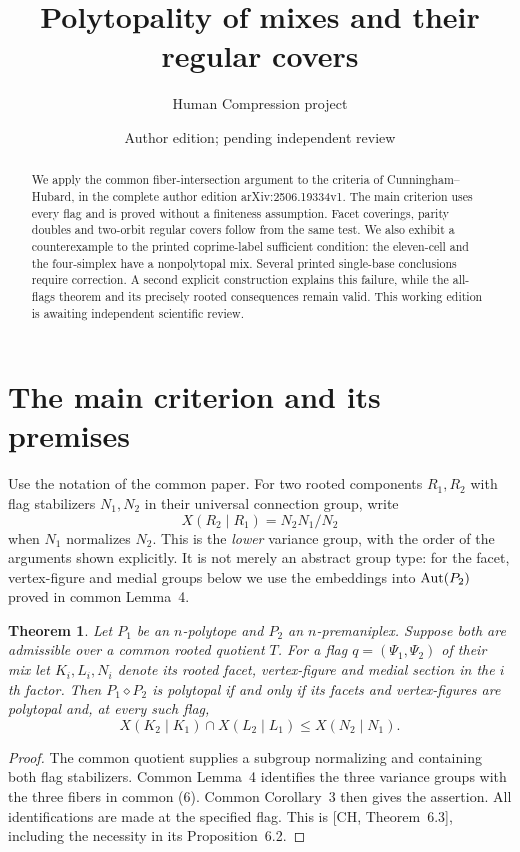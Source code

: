 \documentclass[a4paper,11pt]{article}
\title{Polytopality of mixes and their regular covers}
\author{Human Compression project}\date{Author edition; pending independent review}
\newcommand{\mix}{\mathbin{\diamond}}\newcommand{\Alt}{\operatorname{Alt}}
\newtheorem{theorem}{Theorem}\newtheorem{proposition}[theorem]{Proposition}\newtheorem{corollary}[theorem]{Corollary}
\begin{document}
\maketitle
\begin{abstract}
We apply the common fiber-intersection argument to the criteria of
Cunningham--Hubard, in the complete author edition arXiv:2506.19334v1.
The main criterion uses every flag and is proved without a finiteness
assumption. Facet coverings, parity doubles and two-orbit regular covers
follow from the same test. We also exhibit a counterexample to the
printed coprime-label sufficient condition: the eleven-cell and the
four-simplex have a nonpolytopal mix. Several printed single-base conclusions require correction. A second
explicit construction explains this failure, while the all-flags theorem
and its precisely rooted consequences remain valid. This working edition
is awaiting independent scientific review.
\end{abstract}

\section{The main criterion and its premises}
Use the notation of the common paper. For two rooted components $R_1,R_2$
with flag stabilizers $N_1,N_2$ in their universal connection group, write
\[
 X(R_2\mid R_1)=N_2N_1/N_2
\]
when $N_1$ normalizes $N_2$. This is the \emph{lower} variance group, with
the order of the arguments shown explicitly. It is not merely an abstract
group type: for the facet, vertex-figure and medial groups below we use
the embeddings into $\operatorname{Aut}(P_2)$ proved in common Lemma~4.

\begin{theorem}\label{main}
Let $P_1$ be an $n$-polytope and $P_2$ an $n$-premaniplex. Suppose
both are admissible over a common rooted quotient $T$. For a flag
$q=(\Psi_1,\Psi_2)$ of their mix let $K_i,L_i,N_i$ denote its rooted
facet, vertex-figure and medial section in the $i$th factor.
Then $P_1\mix P_2$ is polytopal if and only if its facets and
vertex-figures are polytopal and, at every such flag,
\[
 X(K_2\mid K_1)\cap X(L_2\mid L_1)\leq X(N_2\mid N_1). \tag{1}
\]
\end{theorem}
\begin{proof}
The common quotient supplies a subgroup normalizing and containing both
flag stabilizers. Common Lemma~4 identifies the three variance groups
with the three fibers in common (6). Common Corollary~3 then gives the
assertion. All identifications are made at the specified flag. This is
[CH, Theorem~6.3], including the necessity in its Proposition~6.2.
\end{proof}
\end{document}
